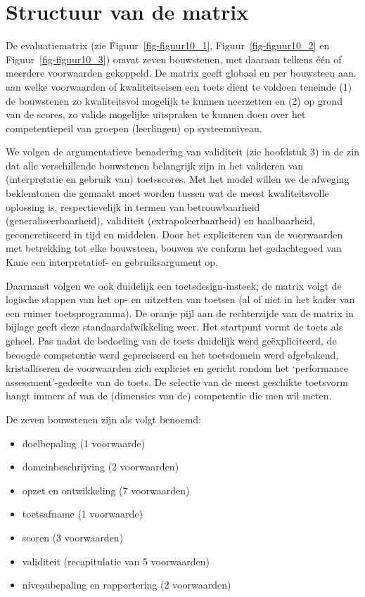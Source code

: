 \documentclass[
  letterpaper,
]{report}
\providecommand{\tightlist}{%
  \setlength{\itemsep}{0pt}\setlength{\parskip}{0pt}}
\begin{document}
\hypertarget{structuur-van-de-matrix}{%
\section{Structuur van de matrix}\label{structuur-van-de-matrix}}

De evaluatiematrix (zie Figuur~\ref{fig-figuur10_1},
Figuur~\ref{fig-figuur10_2} en Figuur~\ref{fig-figuur10_3}) omvat zeven
bouwstenen, met daaraan telkens één of meerdere voorwaarden gekoppeld.
De matrix geeft globaal en per bouwsteen aan, aan welke voorwaarden of
kwaliteitseisen een toets dient te voldoen teneinde (1) de bouwstenen zo
kwaliteitsvol mogelijk te kunnen neerzetten en (2) op grond van de
scores, zo valide mogelijke uitspraken te kunnen doen over het
competentiepeil van groepen (leerlingen) op systeemniveau.

We volgen de argumentatieve benadering van validiteit (zie hoofdstuk 3)
in de zin dat alle verschillende bouwstenen belangrijk zijn in het
valideren van (interpretatie en gebruik van) toetsscores. Met het model
willen we de afweging beklemtonen die gemaakt moet worden tussen wat de
meest kwaliteitsvolle oplossing is, respectievelijk in termen van
betrouwbaarheid (generaliseerbaarheid), validiteit (extrapoleerbaarheid)
en haalbaarheid, geconcretiseerd in tijd en middelen. Door het
expliciteren van de voorwaarden met betrekking tot elke bouwsteen,
bouwen we conform het gedachtegoed van Kane een interpretatief- en
gebruiksargument op.

Daarnaast volgen we ook duidelijk een toetsdesign-insteek; de matrix
volgt de logische stappen van het op- en uitzetten van toetsen (al of
niet in het kader van een ruimer toetsprogramma). De oranje pijl aan de
rechterzijde van de matrix in bijlage geeft deze standaardafwikkeling
weer. Het startpunt vormt de toets als geheel. Pas nadat de bedoeling
van de toets duidelijk werd geëxpliciteerd, de beoogde competentie werd
gepreciseerd en het toetsdomein werd afgebakend, kristalliseren de
voorwaarden zich expliciet en gericht rondom het `performance
assessment'-gedeelte van de toets. De selectie van de meest geschikte
toetsvorm hangt immers af van de (dimensies van de) competentie die men
wil meten.

De zeven bouwstenen zijn als volgt benoemd:

\begin{itemize}
\tightlist
\item
  doelbepaling (1 voorwaarde)
\item
  domeinbeschrijving (2 voorwaarden)
\item
  opzet en ontwikkeling (7 voorwaarden)
\item
  toetsafname (1 voorwaarde)
\item
  scoren (3 voorwaarden)
\item
  validiteit (recapitulatie van 5 voorwaarden)
\item
  niveaubepaling en rapportering (2 voorwaarden)
\end{itemize}
\end{document}
